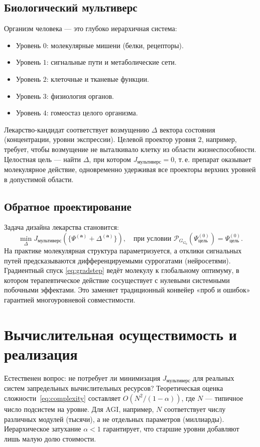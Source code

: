 \documentclass[11pt,a4paper]{article}
\theoremstyle{definition}
\newcommand{\pG}{\mathcal{P}_{\!G}}
\newcommand{\Jfunc}{J_{\text{мультиверс}}}
\begin{document}
\subsection{Биологический мультиверс}

Организм человека — это глубоко иерархичная система:
\begin{itemize}
    \item Уровень $0$: молекулярные мишени (белки, рецепторы).
    \item Уровень $1$: сигнальные пути и метаболические сети.
    \item Уровень $2$: клеточные и тканевые функции.
    \item Уровень $3$: физиология органов.
    \item Уровень $4$: гомеостаз целого организма.
\end{itemize}

Лекарство-кандидат соответствует возмущению $\Delta$ вектора состояния (концентрации, уровни экспрессии). Целевой проектор уровня $2$, например, требует, чтобы возмущение не выталкивало клетку из области жизнеспособности. Целостная цель — найти $\Delta$, при котором $\Jfunc=0$, т. е. препарат оказывает молекулярное действие, одновременно удерживая все проекторы верхних уровней в допустимой области.

\subsection{Обратное проектирование}

Задача дизайна лекарства становится:
\[
\min_{\Delta} \Jfunc(\{\Psi^{(\mathbf{a})} + \Delta^{(\mathbf{a})}\}),\quad \text{при условии } \pG_{G_0} (\Psi^{(0)}_{\text{цель}}) = \Psi^{(0)}_{\text{цель}}.
\]
На практике молекулярная структура параметризуется, а отклики сигнальных путей предсказываются дифференцируемыми суррогатами (нейросетями). Градиентный спуск \eqref{eq:gradstep} ведёт молекулу к глобальному оптимуму, в котором терапевтическое действие сосуществует с нулевыми системными побочными эффектами. Это заменяет традиционный конвейер «проб и ошибок» гарантией многоуровневой совместимости.

\section{Вычислительная осуществимость и реализация}
\label{sec:feasibility}

Естественен вопрос: не потребует ли минимизация $\Jfunc$ для реальных систем запредельных вычислительных ресурсов? Теоретическая оценка сложности~\eqref{eq:complexity} составляет $O(N^2/(1-\alpha))$, где $N$ — типичное число подсистем на уровне. Для AGI, например, $N$ соответствует числу различных модулей (тысячи), а не отдельных параметров (миллиарды). Иерархическое затухание $\alpha<1$ гарантирует, что старшие уровни добавляют лишь малую долю стоимости.
\end{document}
